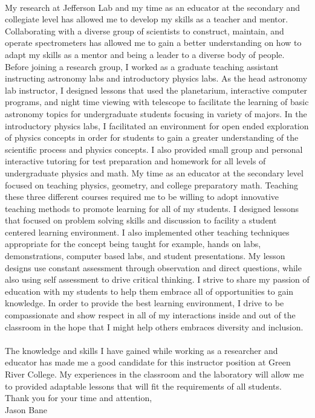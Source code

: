 \documentclass[12pt,letterpaper]{article}
\begin{document}
\paragraph{}My research at Jefferson Lab and my time as an educator at the secondary and collegiate level has allowed me to develop my skills as a teacher and mentor. Collaborating with a diverse group of scientists to construct, maintain, and operate spectrometers has allowed me to gain a better understanding on how to adapt my skills as a mentor and being a leader to a diverse body of people. Before joining a research group, I worked as a graduate teaching assistant instructing astronomy labs and introductory physics labs. As the head astronomy lab instructor, I designed lessons that used the planetarium, interactive computer programs, and night time viewing with telescope to facilitate the learning of basic astronomy topics for undergraduate students focusing in variety of majors. In the introductory physics labs, I facilitated an environment for open ended exploration of physics concepts in order for students to gain a greater understanding of the scientific process and physics concepts. I also provided small group and personal interactive tutoring for test preparation and homework for all levels of undergraduate physics and math. My time as an educator at the secondary level focused on teaching physics, geometry, and  college preparatory math. Teaching these three different courses required me to be willing to adopt innovative teaching methods to promote learning for all of my students. I designed lessons that focused on problem solving skills and discussion to facility a student centered learning environment. I also implemented other teaching techniques appropriate for the concept being taught for example, hands on labs, demonstrations, computer based labs, and student presentations. My lesson designs use constant assessment through observation and direct questions, while also using self assessment to drive critical thinking. I strive to share my passion of education with my students to help them embrace all of opportunities to gain knowledge. In order to provide the best learning environment, I drive to be compassionate and show respect in all of my interactions inside and out of the classroom in the hope that I might help others embraces diversity and inclusion. 

\paragraph{}The knowledge and skills I have gained while working as a researcher and educator has made me a good candidate for this instructor position at Green River College. My experiences in the classroom and the laboratory will allow me to provided adaptable lessons that will fit the requirements of all students. 
\\

\noindent Thank you for your time and attention,\\
\noindent Jason Bane
\end{document}
